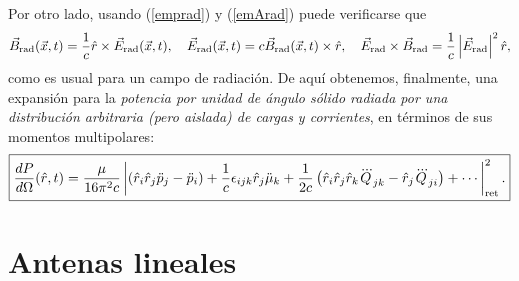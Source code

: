 Por otro lado, usando (\ref{emprad}) y (\ref{emArad}) puede verificarse que
\begin{equation}
 \vec{B}_{\rm rad}(\vec{x},t)=\frac{1}{c}\hat{r}\times\vec{E}_{\rm rad}(\vec{x},t), \quad  \vec{E}_{\rm rad}(\vec{x},t)=c\vec{B}_{\rm rad}(\vec{x},t)\times\hat{r}, \quad \vec{E}_{\rm rad}\times\vec{B}_{\rm rad}=\frac{1}{c}\left|\vec{E}_{\rm rad}\right|^2\hat{r},
\end{equation}
como es usual para un campo de radiación. De aquí obtenemos, finalmente, una expansión para la \textit{potencia por unidad de ángulo sólido radiada por una distribución arbitraria (pero aislada) de cargas y corrientes}, en términos de sus momentos multipolares:
\begin{equation}
 \boxed{\frac{dP}{d\Omega}(\hat{r},t)=\frac{\mu}{16\pi^2c} \left|\left(\hat{r}_i\hat{r}_j\ddot{p}_j-\ddot{p}_i\right)+\frac{1}{c}\epsilon_{ijk}\hat{r}_j\ddot{\mu}_k+\frac{1}{2c}\left(\hat{r}_i\hat{r}_j\hat{r}_k\dddot{Q}_{jk}-\hat{r}_j\dddot{Q}_{ji} \right)+\cdots\right|^2_{\rm ret}.}
\end{equation}


\section{Antenas lineales}

